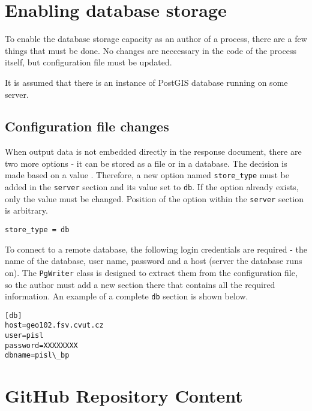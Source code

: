 \chapter{Enabling database storage}
\label{Enabling-database-storage}

To enable the database storage capacity as an author of a process, there are a few things that must be done. No changes are neccessary in the code of the process itself, but configuration file must be updated. 

It is assumed that there is an instance of PostGIS database running on some server.


\section{Configuration file changes}

When output data is not embedded directly in the response document, there are two more options - it can be stored as a file or in a database. The decision is made based on a value . Therefore, a new option named \texttt{store\_type} must be added in the \texttt{server} section and its value set to \texttt{db}. If the option already exists, only the value must be changed. Position of the option within the \texttt{server} section is arbitrary.

\begin{verbatim}
store_type = db
\end{verbatim}


To connect to a remote database, the following login credentials are required - the name of the database, user name, password and a host (server the database runs on). The \texttt{PgWriter} class is designed to extract them from the configuration file, so the author must add a new section there that contains all the required information. An example of a complete  \texttt{db} section is shown below.

\begin{verbatim}
[db]
host=geo102.fsv.cvut.cz
user=pisl
password=XXXXXXXX
dbname=pisl\_bp
\end{verbatim}







\chapter{GitHub Repository Content}
\label{cd}



